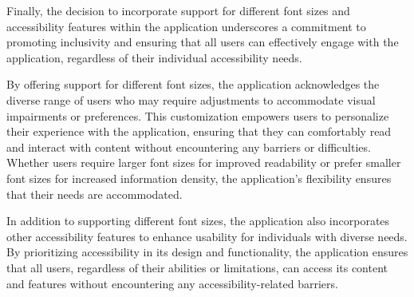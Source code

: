 Finally, the decision to incorporate support for different font sizes and accessibility features within the application underscores a commitment to promoting inclusivity and ensuring that all users can effectively engage with the application, regardless of their individual accessibility needs.

By offering support for different font sizes, the application acknowledges the diverse range of users who may require adjustments to accommodate visual impairments or preferences. This customization empowers users to personalize their experience with the application, ensuring that they can comfortably read and interact with content without encountering any barriers or difficulties. Whether users require larger font sizes for improved readability or prefer smaller font sizes for increased information density, the application's flexibility ensures that their needs are accommodated.

In addition to supporting different font sizes, the application also incorporates other accessibility features to enhance usability for individuals with diverse needs. By prioritizing accessibility in its design and functionality, the application ensures that all users, regardless of their abilities or limitations, can access its content and features without encountering any accessibility-related barriers.